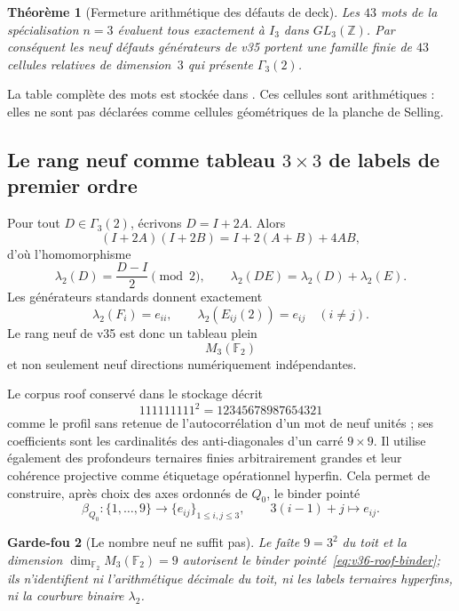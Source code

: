 \documentclass[11pt,a4paper]{article}
\newtheorem{theorem}{Théorème}[section]
\newtheorem{guardrail}[theorem]{Garde-fou}
\begin{document}
\begin{theorem}[Fermeture arithmétique des défauts de deck]\label{thm:v36-gamma3-3cells}
Les $43$ mots de la spécialisation $n=3$ évaluent tous exactement à $I_3$ dans $GL_3(\mathbb Z)$. Par conséquent les neuf défauts générateurs de v35 portent une famille finie de $43$ cellules relatives de dimension~$3$ qui présente $\Gamma_3(2)$.
\end{theorem}

La table complète des mots est stockée dans . Ces cellules sont arithmétiques : elles ne sont pas déclarées comme cellules géométriques de la planche de Selling.

\subsection{Le rang neuf comme tableau $3\times3$ de labels de premier ordre}

Pour tout $D\in\Gamma_3(2)$, écrivons $D=I+2A$. Alors
\[
(I+2A)(I+2B)=I+2(A+B)+4AB,
\]
d'où l'homomorphisme
\begin{equation}\label{eq:v36-lambda2-hom}
\lambda_2(D)=\frac{D-I}{2}\pmod2,
\qquad
\lambda_2(DE)=\lambda_2(D)+\lambda_2(E).
\end{equation}
Les générateurs standards donnent exactement
\begin{equation}\label{eq:v36-lambda-matrix-units}
\boxed{
 \lambda_2(F_i)=e_{ii},
 \qquad
 \lambda_2(E_{ij}(2))=e_{ij}\quad(i\ne j).
}
\end{equation}
Le rang neuf de v35 est donc un tableau plein
\[
\boxed{M_3(\mathbb F_2)}
\]
et non seulement neuf directions numériquement indépendantes.

Le corpus roof conservé dans le stockage décrit
\[
111111111^2=12345678987654321
\]
comme le profil sans retenue de l'autocorrélation d'un mot de neuf unités ; ses coefficients sont les cardinalités des anti-diagonales d'un carré $9\times9$. Il utilise également des profondeurs ternaires finies arbitrairement grandes et leur cohérence projective comme étiquetage opérationnel hyperfin. Cela permet de construire, après choix des axes ordonnés de $Q_0$, le binder pointé
\begin{equation}\label{eq:v36-roof-binder}
\beta_{Q_0}:\{1,\ldots,9\}\longrightarrow\{e_{ij}\}_{1\le i,j\le3},
\qquad
3(i-1)+j\longmapsto e_{ij}.
\end{equation}

\begin{guardrail}[Le nombre neuf ne suffit pas]
Le faîte $9=3^2$ du toit et la dimension $\dim_{\mathbb F_2}M_3(\mathbb F_2)=9$ autorisent le binder pointé~\eqref{eq:v36-roof-binder}; ils n'identifient ni l'arithmétique décimale du toit, ni les labels ternaires hyperfins, ni la courbure binaire $\lambda_2$.
\end{guardrail}
\end{document}
